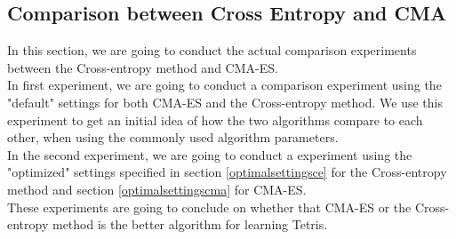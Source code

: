 \subsection{Comparison between Cross Entropy and CMA}

In this section, we are going to conduct the actual comparison experiments between the Cross-entropy method
and CMA-ES.\\
In first experiment, we are going to conduct a comparison experiment using the 
"default" settings for both CMA-ES and the Cross-entropy method. We use this experiment to
get an initial idea of how the two algorithms compare to each other, when using the commonly
used algorithm parameters.\\
In the second experiment, we are going to conduct a experiment using the "optimized" settings
specified in section \ref{optimalsettingsce} for the Cross-entropy method and section
\ref{optimalsettingscma} for CMA-ES.\\
These experiments are going to conclude on whether that CMA-ES or the Cross-entropy method
is the better algorithm for learning Tetris.






